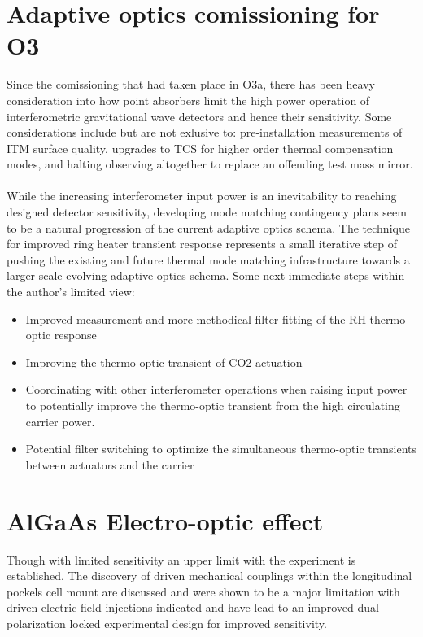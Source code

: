 \section{Adaptive optics comissioning for O3}
Since the comissioning that had taken place in O3a, there has been heavy consideration into how point absorbers limit the high power operation of interferometric gravitational wave detectors and hence their sensitivity. Some considerations include but are not exlusive to: pre-installation measurements of ITM surface quality, upgrades to TCS for higher order thermal compensation modes, and halting observing altogether to replace an offending test mass mirror. 
\\
\\
While the increasing interferometer input power is an inevitability to reaching designed detector sensitivity, developing mode matching contingency plans seem to be a natural progression of the current adaptive optics schema. The technique for improved ring heater transient response represents a small iterative step of pushing the existing and future thermal mode matching infrastructure towards a larger scale evolving adaptive optics schema. Some next immediate steps within the author's limited view:

\begin{itemize}
	\item Improved measurement and more methodical filter fitting of the RH thermo-optic response
	\item Improving the thermo-optic transient of CO2 actuation
	\item Coordinating with other interferometer operations when raising input power to potentially improve the thermo-optic transient from the high circulating carrier power.
	\item Potential filter switching to optimize the simultaneous thermo-optic transients between actuators and the carrier 
\end{itemize}

\section{AlGaAs Electro-optic effect}
Though with limited sensitivity an upper limit with the experiment is established. The discovery of driven mechanical couplings within the longitudinal pockels cell mount are discussed and were shown to be a major limitation with driven electric field injections indicated and have lead to an improved dual-polarization locked experimental design for improved sensitivity.

